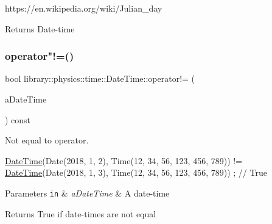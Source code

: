 https\+://en.wikipedia.\+org/wiki/\+Julian\+\_\+day

\begin{DoxyReturn}{Returns}
Date-\/time 
\end{DoxyReturn}
\mbox{\label{classlibrary_1_1physics_1_1time_1_1_date_time_adb0937a46bac7d64307e52dc323e405e}} 
\subsubsection{\texorpdfstring{operator"!=()}{operator!=()}}
{\footnotesize\ttfamily bool library\+::physics\+::time\+::\+Date\+Time\+::operator!= (\begin{DoxyParamCaption}\item[{const \hyperlink{classlibrary_1_1physics_1_1time_1_1_date_time}{Date\+Time} \&}]{a\+Date\+Time }\end{DoxyParamCaption}) const}



Not equal to operator. 


\begin{DoxyCode}
\hyperlink{classlibrary_1_1physics_1_1time_1_1_date_time_a4ea629e533f335c928e037c4ead4646e}{DateTime}(Date(2018, 1, 2), Time(12, 34, 56, 123, 456, 789)) != \hyperlink{classlibrary_1_1physics_1_1time_1_1_date_time_a4ea629e533f335c928e037c4ead4646e}{DateTime}(Date(2018, 1, 3), 
      Time(12, 34, 56, 123, 456, 789)) ; \textcolor{comment}{// True}
\end{DoxyCode}



\begin{DoxyParams}[1]{Parameters}
\mbox{\tt in}  & {\em a\+Date\+Time} & A date-\/time \\
\hline
\end{DoxyParams}
\begin{DoxyReturn}{Returns}
True if date-\/times are not equal 
\end{DoxyReturn}
\mbox{\label{classlibrary_1_1physics_1_1time_1_1_date_time_a5b0e9a861247e7132cdd6880a7ec2381}} 
